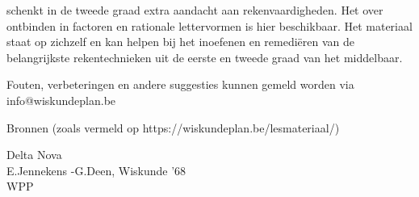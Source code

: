 \documentclass{ximera}
\begin{document}
	\author{Wiskundeplan}



 schenkt in de tweede graad extra aandacht aan rekenvaardigheden. 
Het  over ontbinden in factoren en rationale lettervormen is hier beschikbaar. 
Het materiaal staat op zichzelf en kan helpen bij het inoefenen en remediëren van de belangrijkste rekentechnieken uit de eerste en tweede graad van het middelbaar.  


Fouten, verbeteringen en andere suggesties kunnen gemeld worden via info@wiskundeplan.be
\vspace{1cm}




Bronnen (zoals vermeld op https://wiskundeplan.be/lesmateriaal/)

Delta Nova\\
E.Jennekens -G.Deen, Wiskunde '68\\
WPP\\
\end{document}
